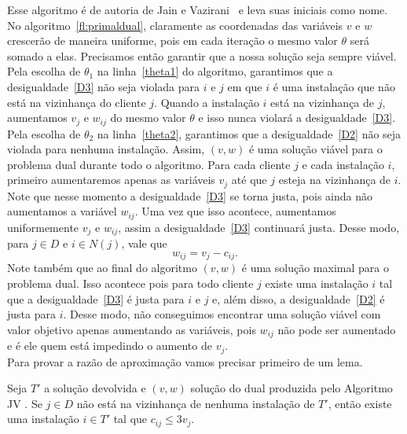 Esse algoritmo é de autoria de Jain e Vazirani~\cite{JV} e leva suas iniciais como nome.
No algoritmo~\ref{fl:primaldual}, claramente as coordenadas das variáveis $v$ e $w$ crescerão de maneira uniforme, pois em cada iteração o mesmo valor $\theta$ será somado a elas. Precisamos então garantir que a nossa solução seja sempre viável. Pela escolha de $\theta_1$ na linha~\ref{theta1} do algoritmo, garantimos que a desigualdade~\eqref{D3} não seja violada para $i$ e $j$ em que $i$ é uma instalação que não está na vizinhança do cliente $j$. Quando a instalação $i$ está na vizinhança de $j$, aumentamos $v_j$ e $w_{ij}$ do mesmo valor $\theta$ e isso nunca violará a desigualdade~\eqref{D3}. 
Pela escolha de $\theta_2$ na linha~\ref{theta2}, garantimos que a desigualdade~\eqref{D2} não seja violada para nenhuma instalação. 
Assim, $(v,w)$ é uma solução viável para o problema dual durante todo o algoritmo.
Para cada cliente $j$ e cada instalação $i$, primeiro aumentaremos apenas as variáveis $v_j$ até que $j$ esteja na vizinhança de $i$. Note que nesse momento a desigualdade~\eqref{D3} se torna justa, pois ainda não aumentamos a variável $w_{ij}$. Uma vez que isso acontece, aumentamos uniformemente $v_j$ e $w_{ij}$, assim a desigualdade~\eqref{D3} continuará justa. Desse modo, para $j \in D$ e $i \in N(j)$, vale que 
\begin{equation}\label{Djusta:*}  
w_{ij} = v_j - c_{ij}.
\end{equation}
Note também que ao final do algoritmo $(v,w)$ é uma solução maximal para o problema dual. Isso acontece pois para todo cliente $j$ existe uma instalação $i$ tal que a desigualdade~\eqref{D3} é justa para $i$ e $j$ e, além disso, a desigualdade~\eqref{D2} é justa para $i$. Desse modo, não conseguimos encontrar uma solução viável com valor objetivo apenas aumentando as variáveis, pois $w_{ij}$ não pode ser aumentado e é ele quem está impedindo o aumento de $v_j$. \\
Para provar a razão de aproximação vamos precisar primeiro de um lema.
\begin{lemma}
    \label{lemma:3.9}
    Seja $T'$ a solução devolvida e $(v,w)$ solução do dual produzida pelo Algoritmo {\sc JV }. Se $j \in D$ não está na vizinhança de nenhuma instalação de $T'$, então existe uma instalação $i \in T'$ tal que $c_{ij} \leq 3v_j$.
\end{lemma}
